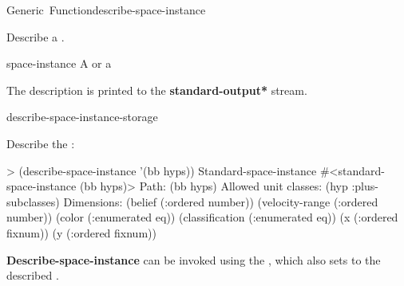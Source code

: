 \documentclass[10pt,twoside,english,pdftex]{article}
\begin{document}
\begin{functiondoc}{Generic~Function}{describe-space-instance}%
  {}
%
%

\fnsyntax

\fnpurpose Describe a .

\fnmethods
{}%
  {\code{(} }
%
  {\code{(} }

\fnpackage {}

\fnmodule {}

\fnargs
\begin{args}{space-instance}
 A  or a 
\end{args}

\fndescription
{}%
The description is printed to the {\bf *standard-output*} stream.

\begin{alsos}{describe-space-instance-storage}
\end{alsos}

\fnexample
Describe the  :
%
\W\supp
\begin{example}
> (describe-space-instance '(bb hyps))
  Standard-space-instance #<standard-space-instance (bb hyps)>
    Path: (bb hyps)
    Allowed unit classes:
      (hyp :plus-subclasses)
    Dimensions:
      (belief (:ordered number))
      (velocity-range (:ordered number))
      (color (:enumerated eq))
      (classification (:enumerated eq))
      (x (:ordered fixnum))
      (y (:ordered fixnum))
\end{example}

\fnnote 
%
%
%
\textbf{Describe-space-instance} can be invoked using the 
, which also sets \code{=} to the described .

\end{functiondoc}

\end{document}
